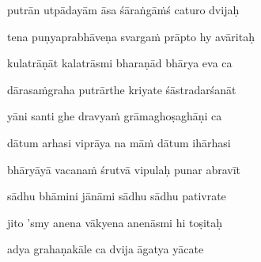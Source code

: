 putrān utpādayām āsa śāraṅgāṁś caturo dvijaḥ \veg\dontdisplaylinenum
{}

tena puṇyaprabhāveṇa svargaṁ prāpto hy avāritaḥ\thinspace{\dandab} \dontdisplaylinenum
{}

kulatrāṇāt kalatrāsmi bharaṇād bhārya eva ca \veg\dontdisplaylinenum
{}

dārasaṁgraha putrārthe kriyate śāstradarśanāt\thinspace{\dandab} \dontdisplaylinenum
{}

yāni santi ghe dravyaṁ grāmaghoṣaghāṇi ca \veg\dontdisplaylinenum

dātum arhasi viprāya na māṁ dātum ihārhasi\thinspace{\dandab} \dontdisplaylinenum

bhāryāyā vacanaṁ śrutvā vipulaḥ punar abravīt \veg\dontdisplaylinenum
{}

sādhu bhāmini jānāmi sādhu sādhu pativrate\thinspace{\dandab} \dontdisplaylinenum
{}

jito 'smy anena vākyena anenāsmi hi toṣitaḥ \veg\dontdisplaylinenum
{}

adya grahaṇakāle ca dvija āgatya yācate\thinspace{\dandab} \dontdisplaylinenum

